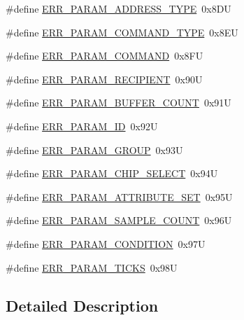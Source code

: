 \begin{DoxyCompactItemize}
\item 
\#define \hyperlink{group___p_e___error__module_ga1c4b94765db3ec158123c398ed5da5b8}{E\+R\+R\+\_\+\+P\+A\+R\+A\+M\+\_\+\+A\+D\+D\+R\+E\+S\+S\+\_\+\+T\+Y\+PE}~0x8\+DU
\item 
\#define \hyperlink{group___p_e___error__module_gaa4b11a6a865c37326c099bc4f1d78b76}{E\+R\+R\+\_\+\+P\+A\+R\+A\+M\+\_\+\+C\+O\+M\+M\+A\+N\+D\+\_\+\+T\+Y\+PE}~0x8\+EU
\item 
\#define \hyperlink{group___p_e___error__module_gacedd3065faf570636ea5fb7774692682}{E\+R\+R\+\_\+\+P\+A\+R\+A\+M\+\_\+\+C\+O\+M\+M\+A\+ND}~0x8\+FU
\item 
\#define \hyperlink{group___p_e___error__module_gaead210c48411ddaef2b924a793ca2486}{E\+R\+R\+\_\+\+P\+A\+R\+A\+M\+\_\+\+R\+E\+C\+I\+P\+I\+E\+NT}~0x90U
\item 
\#define \hyperlink{group___p_e___error__module_gaa070f4244e26b8960766fab29f297fb8}{E\+R\+R\+\_\+\+P\+A\+R\+A\+M\+\_\+\+B\+U\+F\+F\+E\+R\+\_\+\+C\+O\+U\+NT}~0x91U
\item 
\#define \hyperlink{group___p_e___error__module_gae92766dcfa23207f4a9f6f5c9ee44b9c}{E\+R\+R\+\_\+\+P\+A\+R\+A\+M\+\_\+\+ID}~0x92U
\item 
\#define \hyperlink{group___p_e___error__module_ga01376cfa1506fab58b0ee14cb2a66285}{E\+R\+R\+\_\+\+P\+A\+R\+A\+M\+\_\+\+G\+R\+O\+UP}~0x93U
\item 
\#define \hyperlink{group___p_e___error__module_ga8c4e33d53312b200230a2640a8fdd524}{E\+R\+R\+\_\+\+P\+A\+R\+A\+M\+\_\+\+C\+H\+I\+P\+\_\+\+S\+E\+L\+E\+CT}~0x94U
\item 
\#define \hyperlink{group___p_e___error__module_ga23cb0d6ae40cae77d576f567521bd992}{E\+R\+R\+\_\+\+P\+A\+R\+A\+M\+\_\+\+A\+T\+T\+R\+I\+B\+U\+T\+E\+\_\+\+S\+ET}~0x95U
\item 
\#define \hyperlink{group___p_e___error__module_ga1285a1de60cce467f4d79bc73cd68af7}{E\+R\+R\+\_\+\+P\+A\+R\+A\+M\+\_\+\+S\+A\+M\+P\+L\+E\+\_\+\+C\+O\+U\+NT}~0x96U
\item 
\#define \hyperlink{group___p_e___error__module_gac616d07a0eba03bad3f1a78e11df56bf}{E\+R\+R\+\_\+\+P\+A\+R\+A\+M\+\_\+\+C\+O\+N\+D\+I\+T\+I\+ON}~0x97U
\item 
\#define \hyperlink{group___p_e___error__module_gafd38dd8d28af4d134dc8af4cadc4a59f}{E\+R\+R\+\_\+\+P\+A\+R\+A\+M\+\_\+\+T\+I\+C\+KS}~0x98U
\end{DoxyCompactItemize}


\subsection{Detailed Description}


